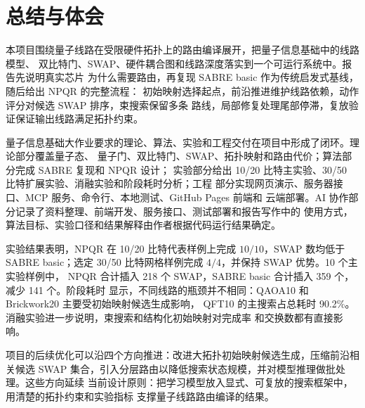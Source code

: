 \section{总结与体会}

本项目围绕量子线路在受限硬件拓扑上的路由编译展开，把量子信息基础中的线路模型、
双比特门、SWAP、硬件耦合图和线路深度落实到一个可运行系统中。报告先说明真实芯片
为什么需要路由，再复现 SABRE basic 作为传统启发式基线，随后给出 NPQR 的完整流程：
初始映射选择起点，前沿推进维护线路依赖，动作评分对候选 SWAP 排序，束搜索保留多条
路线，局部修复处理尾部停滞，复放验证保证输出线路满足拓扑约束。

量子信息基础大作业要求的理论、算法、实验和工程交付在项目中形成了闭环。理论部分覆盖量子态、
量子门、双比特门、SWAP、拓扑映射和路由代价；算法部分完成 SABRE 复现和 NPQR 设计；
实验部分给出 10/20 比特主实验、30/50 比特扩展实验、消融实验和阶段耗时分析；工程
部分实现网页演示、服务器接口、MCP 服务、命令行、本地测试、GitHub Pages 前端和
云端部署。AI 协作部分记录了资料整理、前端开发、服务接口、测试部署和报告写作中的
使用方式，算法目标、实验口径和结果解释由作者根据代码运行结果确定。

实验结果表明，NPQR 在 10/20 比特代表样例上完成 $10/10$，SWAP 数均低于 SABRE
basic；选定 30/50 比特网格样例完成 $4/4$，并保持 SWAP 优势。10 个主实验样例中，
NPQR 合计插入 218 个 SWAP，SABRE basic 合计插入 359 个，减少 141 个。阶段耗时
显示，不同线路的瓶颈并不相同：QAOA10 和 Brickwork20 主要受初始映射候选生成影响，
QFT10 的主搜索占总耗时 90.2\%。消融实验进一步说明，束搜索和结构化初始映射对完成率
和交换数都有直接影响。

项目的后续优化可以沿四个方向推进：改进大拓扑初始映射候选生成，压缩前沿相关候选
SWAP 集合，引入分层路由以降低搜索状态规模，并对模型推理做批处理。这些方向延续
当前设计原则：把学习模型放入显式、可复放的搜索框架中，用清楚的拓扑约束和实验指标
支撑量子线路路由编译的结果。
